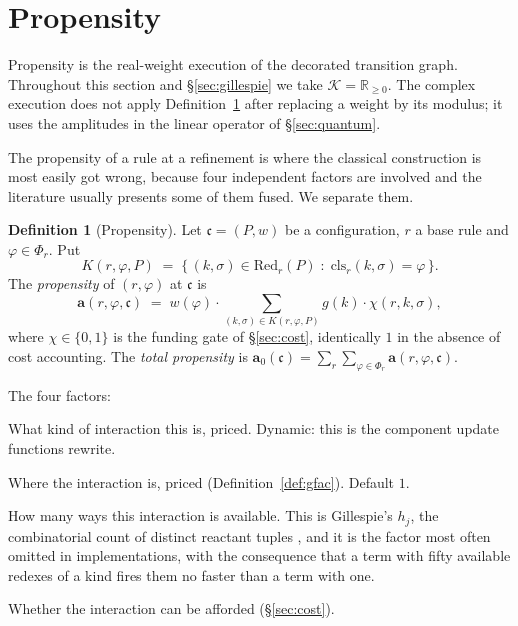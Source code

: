 \documentclass[11pt,a4paper]{article}
\theoremstyle{plain}
\theoremstyle{definition}
\newtheorem{definition}[theorem]{Definition}
\theoremstyle{remark}
\newcommand{\Rnn}{\mathbb{R}_{\geq 0}}
\newcommand{\Red}{\mathrm{Red}}
\newcommand{\prop}{\mathbf{a}}
\newcommand{\wmap}{w}
\newcommand{\gfac}{g}
\newcommand{\class}{\mathrm{cls}}
\begin{document}
\section{Propensity}
\label{sec:propensity}

Propensity is the real-weight execution of the decorated transition graph. Throughout this section
and \S\ref{sec:gillespie} we take $\mathcal{K}=\Rnn$. The complex execution does not apply
Definition~\ref{def:propensity} after replacing a weight by its modulus; it uses the amplitudes in the
linear operator of \S\ref{sec:quantum}.

The propensity of a rule at a refinement is where the classical construction is most easily got
wrong, because four independent factors are involved and the literature usually presents some of
them fused. We separate them.

\begin{definition}[Propensity]
\label{def:propensity}
Let $\mathfrak{c} = (P, \wmap)$ be a configuration, $r$ a base rule and $\varphi \in \Phi_r$. Put
\[
K(r, \varphi, P) \;=\; \{\, (k,\sigma) \in \Red_r(P) \;:\; \class_r(k,\sigma) = \varphi \,\}.
\]
The \emph{propensity} of $(r,\varphi)$ at $\mathfrak{c}$ is
\[
\prop(r,\varphi,\mathfrak{c})
\;=\;
\wmap(\varphi) \cdot \!\!\sum_{(k,\sigma) \in K(r,\varphi,P)}\!\! \gfac(k)\cdot \chi(r,k,\sigma),
\]
where $\chi \in \{0,1\}$ is the funding gate of \S\ref{sec:cost}, identically $1$ in the absence of
cost accounting. The \emph{total propensity} is
$\prop_0(\mathfrak{c}) = \sum_{r}\sum_{\varphi \in \Phi_r} \prop(r,\varphi,\mathfrak{c})$.
\end{definition}

The four factors:
\begin{description}[leftmargin=1.6em,style=nextline]
\item[$\wmap(\varphi)$ --- the rate constant.] What kind of interaction this is, priced. Dynamic:
this is the component update functions rewrite.
\item[$\gfac(k)$ --- the geometric factor.] Where the interaction is, priced
(Definition~\ref{def:gfac}). Default $1$.
\item[The cardinality of the sum --- multiplicity.] How many ways this interaction is available.
This is Gillespie's $h_j$, the combinatorial count of distinct reactant tuples \cite{gillespie77},
and it is the factor most often omitted in implementations, with the consequence that a term with
fifty available redexes of a kind fires them no faster than a term with one.
\item[$\chi$ --- the funding gate.] Whether the interaction can be afforded (\S\ref{sec:cost}).
\end{description}
\end{document}

